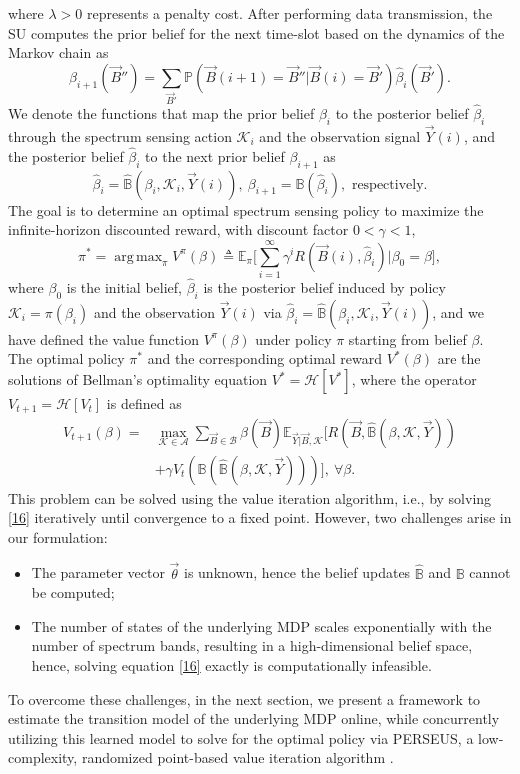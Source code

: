 \documentclass[10pt,twocolumn]{IEEEtran}
\DeclareMathOperator*{\argmax}{arg\,max}
\begin{document}
where $\lambda{>}0$ represents a penalty cost. After performing data transmission, the SU computes the prior belief for the next time-slot based on the dynamics of the Markov chain as
\begin{equation}\label{13}
    \beta_{i+1}(\vec{B}'')=\sum_{\vec{B}'}\mathbb{P}(\vec{B}(i+1) = \vec{B}''|\vec{B}(i)=\vec{B}')\hat{\beta}_{i}(\vec{B}').
\end{equation}
We denote the functions that map the prior belief $\beta_i$ to the posterior belief $\hat\beta_i$ through the spectrum sensing action $\mathcal K_i$ and the observation signal $\vec{Y}(i)$, and the posterior belief $\hat\beta_i$ to the next prior belief $\beta_{i+1}$ as
$$\hat\beta_i{=}\hat{\mathbb B}(\beta_i, \mathcal K_i, \vec{Y}(i)),\ \beta_{i+1}{=}{\mathbb B}(\hat\beta_i),\text{ respectively}.$$
The goal is to determine an optimal spectrum sensing policy to maximize the infinite-horizon discounted reward, with discount factor $0{<}\gamma{<}1$,
\begin{equation}\label{14}
    \pi^{*}{=}\argmax_{\pi} V^{\pi}(\beta) \triangleq \mathbb{E}_{\pi} \Big[\sum_{i=1}^{\infty} \gamma^{i} R(\vec{B}(i), \hat{\beta}_i)|\beta_0 {=}\beta\Big],
\end{equation}
where $\beta_0$ is the initial belief, $\hat\beta_i$ is the posterior belief induced by policy $\mathcal K_i{=}\pi(\beta_i)$ and the observation $\vec{Y}(i)$ via $\hat\beta_i{=}\hat{\mathbb B}(\beta_i, \mathcal K_i, \vec{Y}(i))$, and we have defined the value function $V^{\pi}(\beta)$ under policy $\pi$ starting from belief $\beta$.
The optimal policy $\pi^*$ and the corresponding optimal reward $V^*(\beta)$ are the solutions of Bellman's optimality equation $V^*{=}\mathcal{H}[V^*]$, where the operator $V_{t+1}{=}\mathcal {H}[V_{t}]$ is defined as
\begin{align}\label{16}
\nonumber
        V_{t+1}(\beta) = &\max_{\mathcal{K} {\in} \mathcal{A}} \sum_{\vec{B} {\in} \mathcal{B}} \beta(\vec{B}) \mathbb{E}_{\vec{Y}|\vec{B}, \mathcal{K}} \Big[R(\vec{B}, \hat{\mathbb{B}}(\beta, \mathcal{K}, \vec{Y}))\\ &+\gamma V_{t}(\mathbb{B}(\hat{\mathbb{B}}(\beta, \mathcal{K}, \vec{Y})))\Big],\ \forall \beta.
\end{align}
This problem can be solved using the value iteration algorithm, i.e., by solving \eqref{16} iteratively until convergence to a fixed point. However, two challenges arise in our formulation:
\begin{itemize}
\item The parameter vector $\vec{\theta}$ is unknown, hence the belief updates 
$\hat{\mathbb B}$ and $\mathbb B$ cannot be computed;
\item The number of states of the underlying MDP scales exponentially with the number of spectrum bands, resulting in a high-dimensional belief space, hence, solving equation \eqref{16} exactly is computationally infeasible.
\end{itemize}
To overcome these challenges, in the next section, we present a framework to estimate the transition model of the underlying MDP online, while concurrently utilizing this learned model to solve for the optimal policy via PERSEUS, a low-complexity, randomized point-based value iteration algorithm \cite{DBLP:journals/corr/abs-1109-2145}.
\end{document}
